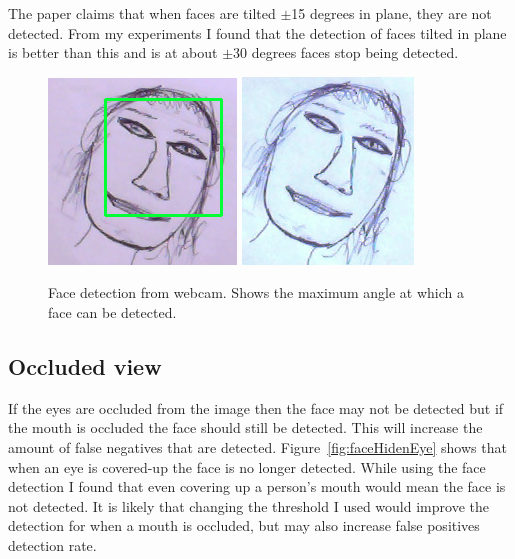 \documentclass[10pt,a4paper,openbib]{article}
\begin{document}
\begin{multicols}{2}
\noindent The paper\cite{violaJones} claims that when faces are tilted $\pm$15 degrees in plane, they are not detected. From my experiments I found that the detection of faces tilted in plane is better than this and is at about $\pm$30 degrees faces stop being detected. 

\begin{figure}[H]
\begin{center}
\includegraphics[scale=0.4]{images/maxAngle.png} 
\includegraphics[scale=0.4]{images/overMaxAngle.png} 
\caption{Face detection from webcam. Shows the maximum angle at which a face can be detected. }
\label{fig:faceMaxAngle}
\end{center}
\end{figure}

\subsection{Occluded view}

If the eyes are occluded from the image then the face may not be detected but if the mouth is occluded the face should still be detected. This will increase the amount of false negatives that are detected. Figure~\ref{fig:faceHidenEye} shows that when an eye is covered-up the face is no longer detected. While using the face detection I found that even covering up a person's mouth would mean the face is not detected. It is likely that changing the threshold I used would improve the detection for when a mouth is occluded, but may also increase false positives detection rate.


\end{multicols}
\end{document}
